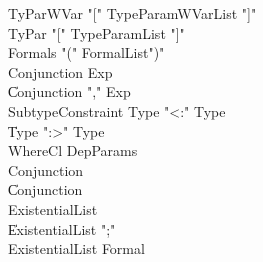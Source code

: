 {\begin{grammar}
 TyParWVar  \: \xcd"[" TypeParamWVarList \xcd"]"\\
 TyPar  \: \xcd"[" TypeParamList \xcd"]"\\
 Formals  \: \xcd"(" FormalList\opt \xcd")"\\
 Conjunction  \: Exp\\
    \| Conjunction \xcd"," Exp\\
 SubtypeConstraint  \: Type  \xcd"<:" Type \\
    \| Type  \xcd":>" Type \\
 WhereCl  \: DepParams\\
 Conjunction\opt  \: \\
    \| Conjunction\\
 ExistentialList\opt  \: \\
    \| ExistentialList \xcd";"\\
 ExistentialList  \: Formal\\
\end{grammar}

\begin{grammar}


\end{grammar}}
